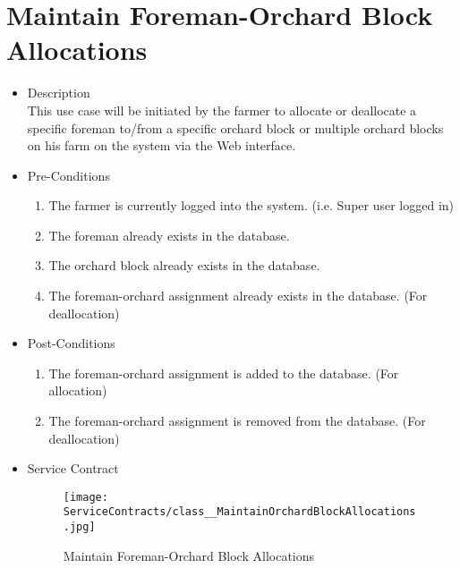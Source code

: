 \documentclass[11pt,fleqn]{book} %
\begin{document}
\section{Maintain Foreman-Orchard Block Allocations}
\begin{itemize}
	\item Description\\
	This use case will be initiated by the farmer to allocate or deallocate a specific foreman to/from a specific orchard block or multiple orchard blocks on his farm on the system via the Web interface.
	\item Pre-Conditions
	\begin{enumerate}
		\item The farmer is currently logged into the system. (i.e. Super user logged in)
		\item The foreman already exists in the database. 
		\item The orchard block already exists in the database.
		\item The foreman-orchard assignment already exists in the database. (For deallocation)					
	\end{enumerate}
	\item Post-Conditions
	\begin{enumerate}
		\item The foreman-orchard assignment is added to the database. (For allocation)
		\item The foreman-orchard assignment is removed from the database. (For deallocation)
	\end{enumerate}
	\item Service Contract
	\begin{figure}
		\texttt{[image: ServiceContracts/class\_\_MaintainOrchardBlockAllocations.jpg]}
		\caption{Maintain Foreman-Orchard Block Allocations}
	\end{figure}
\end{itemize}
\end{document}
